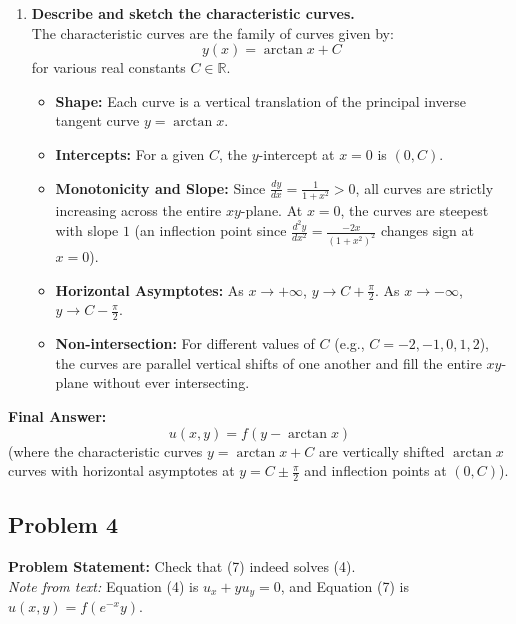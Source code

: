 \documentclass[11pt]{article}
\begin{document}
\begin{enumerate}[label=\textbf{Step \arabic*:}]
    \item \textbf{Describe and sketch the characteristic curves.} \\
    The characteristic curves are the family of curves given by:
    \[
    y(x) = \arctan x + C
    \]
    for various real constants $C \in \mathbb{R}$. 
    \begin{itemize}
        \item \textbf{Shape:} Each curve is a vertical translation of the principal inverse tangent curve $y = \arctan x$.
        \item \textbf{Intercepts:} For a given $C$, the $y$-intercept at $x = 0$ is $(0, C)$.
        \item \textbf{Monotonicity and Slope:} Since $\frac{dy}{dx} = \frac{1}{1+x^2} > 0$, all curves are strictly increasing across the entire $xy$-plane. At $x = 0$, the curves are steepest with slope $1$ (an inflection point since $\frac{d^2y}{dx^2} = \frac{-2x}{(1+x^2)^2}$ changes sign at $x = 0$).
        \item \textbf{Horizontal Asymptotes:} As $x \to +\infty$, $y \to C + \frac{\pi}{2}$. As $x \to -\infty$, $y \to C - \frac{\pi}{2}$.
        \item \textbf{Non-intersection:} For different values of $C$ (e.g., $C = -2, -1, 0, 1, 2$), the curves are parallel vertical shifts of one another and fill the entire $xy$-plane without ever intersecting.
    \end{itemize}
\end{enumerate}

\noindent\textbf{Final Answer:}
\[
\boxed{u(x, y) = f(y - \arctan x)}
\]
(where the characteristic curves $y = \arctan x + C$ are vertically shifted $\arctan x$ curves with horizontal asymptotes at $y = C \pm \frac{\pi}{2}$ and inflection points at $(0, C)$).

\hrulefill

\subsection*{Problem 4}
\textbf{Problem Statement:} Check that (7) indeed solves (4). \\
\emph{Note from text:} Equation (4) is $u_x + yu_y = 0$, and Equation (7) is $u(x, y) = f(e^{-x}y)$.
\end{document}
